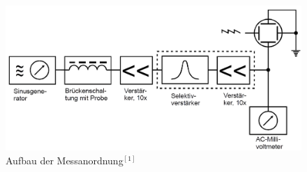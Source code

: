 	\begin{figure}[h]
		\begin{center}
		\includegraphics[scale=0.3]{picaufbau.jpg}
		\caption{Aufbau der Messanordnung$^{[1]}$}
		\label{picaufbau}
		\end{center}	
	\end{figure}